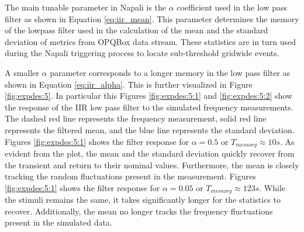 The main tunable parameter in Napali is the $\alpha$ coefficient used in the low pass filter as shown in Equation \ref{eq:iir_mean}.
This parameter determines the memory of the lowpass filter used in the calculation of the mean and the standard deviation of metrics from OPQBox data stream.
These statistics are in turn used during the Napali triggering process to locate sub-threshold gridwide events.

A smaller $\alpha$ parameter corresponds to a longer memory in the low pass filter as shown in Equation \ref{eq:iir_alpha}.
This is further visualized in Figure \ref{fig:expdes:5}.
In particular this Figures \ref{fig:expdes:5:1} and \ref{fig:expdes:5:2} show the response of the IIR low pass filter to the simulated frequency measurements.
The dashed red line represents the frequency measurement, solid red line represents the filtered mean, and the blue line represents the standard deviation.
Figures \ref{fig:expdes:5:1} shows the filter response for $\alpha = 0.5$ or $T_{memory} \approx 10s $.
As evident from the plot, the mean and the standard deviation quickly recover from the transient and return to their nominal values.
Furthermore, the mean is closely tracking the random fluctuations present in the measurement.
Figures \ref{fig:expdes:5:1} shows the filter response for $\alpha = 0.05$ or $T_{memory} \approx 123s $.
While the stimuli remains the same, it takes significantly longer for the statistics to recover.
Additionally, the mean no longer tracks the frequency fluctuations present in the simulated data.
